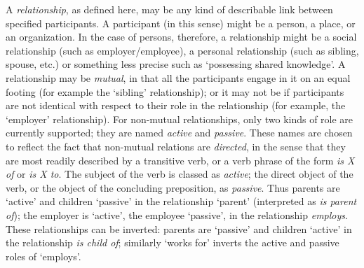 A \textit{relationship}, as defined here, may be any kind of describable link between specified participants. A participant (in this sense) might be a person, a place, or an organization. In the case of persons, therefore, a relationship might be a social relationship (such as employer/employee), a personal relationship (such as sibling, spouse, etc.) or something less precise such as ‘possessing shared knowledge’. A relationship may be \textit{mutual}, in that all the participants engage in it on an equal footing (for example the ‘sibling’ relationship); or it may not be if participants are not identical with respect to their role in the relationship (for example, the ‘employer’ relationship). For non-mutual relationships, only two kinds of role are currently supported; they are named \textit{active} and \textit{passive}. These names are chosen to reflect the fact that non-mutual relations are \textit{directed}, in the sense that they are most readily described by a transitive verb, or a verb phrase of the form \textit{is X of} or \textit{is X to}. The subject of the verb is classed as \textit{active}; the direct object of the verb, or the object of the concluding preposition, as \textit{passive}. Thus parents are ‘active’ and children ‘passive’ in the relationship ‘parent’ (interpreted as \textit{is parent of}); the employer is ‘active’, the employee ‘passive’, in the relationship \textit{employs}. These relationships can be inverted: parents are ‘passive’ and children ‘active’ in the relationship \textit{is child of}; similarly ‘works for’ inverts the active and passive roles of ‘employs’.\par
